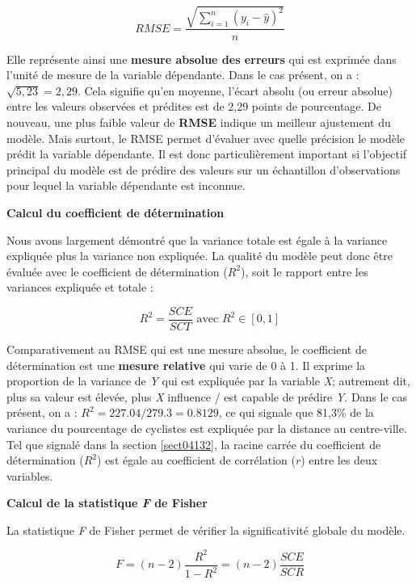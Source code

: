 \documentclass[
  11pt,
  french,
]{book}
\begin{document}
\begin{equation} 
RMSE = \frac{\sqrt{\sum_{i=1}^n (y_{i}-\widehat{y})^2}}{n}
\label{eq:reg5}
\end{equation}

Elle représente ainsi une \textbf{mesure absolue des erreurs} qui est exprimée dans l'unité de mesure de la variable dépendante. Dans le cas présent, on a : \(\sqrt{5,23}=2,29\). Cela signifie qu'en moyenne, l'écart absolu (ou erreur absolue) entre les valeurs observées et prédites est de 2,29 points de pourcentage. De nouveau, une plus faible valeur de \textbf{RMSE} indique un meilleur ajustement du modèle. Mais surtout, le RMSE permet d'évaluer avec quelle précision le modèle prédit la variable dépendante. Il est donc particulièrement important si l'objectif principal du modèle est de prédire des valeurs sur un échantillon d'observations pour lequel la variable dépendante est inconnue.

\textbf{Calcul du coefficient de détermination}

Nous avons largement démontré que la variance totale est égale à la variance expliquée plus la variance non expliquée. La qualité du modèle peut donc être évaluée avec le coefficient de détermination (\(R^2\)), soit le rapport entre les variances expliquée et totale :

\begin{equation} 
R^2 = \frac{SCE}{SCT} \mbox{ avec } R^2 \in \left[0,1\right]
\label{eq:reg6}
\end{equation}

Comparativement au RMSE qui est une mesure absolue, le coefficient de détermination est une \textbf{mesure relative} qui varie de 0 à 1. Il exprime la proportion de la variance de \emph{Y} qui est expliquée par la variable \emph{X}; autrement dit, plus sa valeur est élevée, plus \emph{X} influence / est capable de prédire \emph{Y}. Dans le cas présent, on a : \(R^2 = 227.04 / 279.3 = 0.8129\), ce qui signale que 81,3\% de la variance du pourcentage de cyclistes est expliquée par la distance au centre-ville. Tel que signalé dans la section \ref{sect04132}, la racine carrée du coefficient de détermination (\(R^2\)) est égale au coefficient de corrélation (\(r\)) entre les deux variables.

\textbf{Calcul de la statistique \emph{F} de Fisher}

La statistique \emph{F} de Fisher permet de vérifier la significativité globale du modèle.

\begin{equation} 
F = (n-2)\frac{R^2}{1-R^2} = (n-2)\frac{SCE}{SCR}
\label{eq:reg7}
\end{equation}
\end{document}
